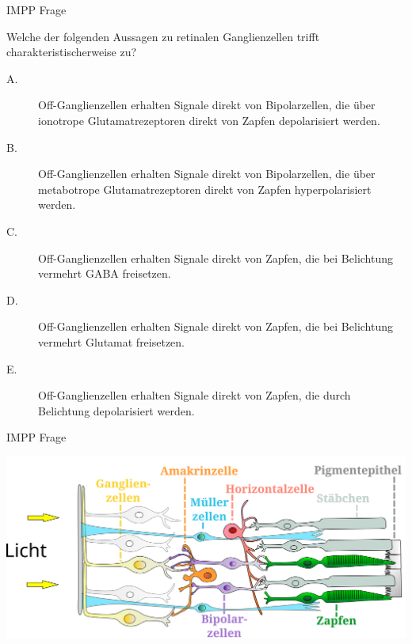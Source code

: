 \documentclass{beamer}
\begin{document}
\begin{frame}{IMPP Frage}

Welche der folgenden Aussagen zu retinalen Ganglienzellen trifft charakteristischerweise zu?

\begin{description}
\item[A.] Off-Ganglienzellen erhalten Signale direkt von Bipolarzellen, die über ionotrope Glutamatrezeptoren direkt von Zapfen depolarisiert werden. %
\item[B.] Off-Ganglienzellen erhalten Signale direkt von Bipolarzellen, die über metabotrope Glutamatrezeptoren direkt von Zapfen hyperpolarisiert werden. 
\item[C.] Off-Ganglienzellen erhalten Signale direkt von Zapfen, die bei Belichtung vermehrt GABA freisetzen.
\item[D.] Off-Ganglienzellen erhalten Signale direkt von Zapfen, die bei Belichtung vermehrt Glutamat freisetzen.
\item[E.] Off-Ganglienzellen erhalten Signale direkt von Zapfen, die durch Belichtung depolarisiert werden.
\end{description}

    
\end{frame}



\begin{frame}{IMPP Frage}
\begin{center}
    \includegraphics[width=\textwidth]{Retina_de.png}
\end{center}
\end{frame}
\end{document}

